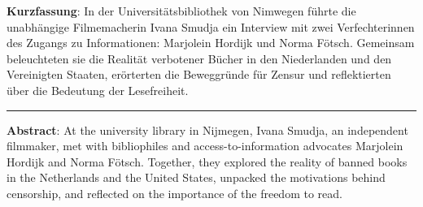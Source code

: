 \textbf{Kurzfassung}: In der Universitätsbibliothek von Nimwegen führte
die unabhängige Filmemacherin Ivana Smudja ein Interview mit zwei
Verfechterinnen des Zugangs zu Informationen: Marjolein Hordijk und
Norma Fötsch. Gemeinsam beleuchteten sie die Realität verbotener Bücher
in den Niederlanden und den Vereinigten Staaten, erörterten die
Beweggründe für Zensur und reflektierten über die Bedeutung der
Lesefreiheit.

\begin{center}\rule{0.5\linewidth}{0.5pt}\end{center}

\noindent\textbf{Abstract}: At the university library in Nijmegen, Ivana Smudja,
an independent filmmaker, met with bibliophiles and
access-to-information advocates Marjolein Hordijk and Norma Fötsch.
Together, they explored the reality of banned books in the Netherlands
and the United States, unpacked the motivations behind censorship, and
reflected on the importance of the freedom to read.
